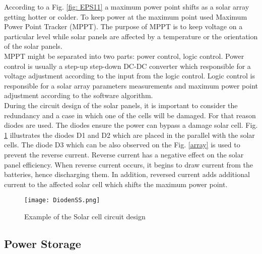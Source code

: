 According to a Fig. \ref{fig: EPS11} a maximum power point shifts as a solar array getting hotter or colder. To keep power at the maximum point used Maximum Power Point Tracker (MPPT). The purpose of MPPT is to keep voltage on a particular level while solar panels are affected by a temperature or the orientation of the solar panels.\\
\cite{20} MPPT might be separated into two parts: power control, logic control. Power control is usually a step-up step-down DC-DC  converter which responsible for a voltage adjustment according to the input from the logic control. Logic control is responsible for a solar array parameters measurements and maximum power point adjustment according to the software algorithm.\\  

During the circuit design of the solar panels, it is important to consider the redundancy and a case in which one of the cells will be damaged. For that reason diodes are used. The diodes ensure the power can bypass a damage solar cell. Fig. \ref{dioden} illustrates the diodes D1 and D2 which are placed in the parallel with the solar cells. The diode D3 which can be also observed on the Fig. \ref{array} is used to prevent the reverse current. Reverse current has a negative effect on the solar panel efficiency. When reverse current occurs, it begins to draw current from the batteries, hence discharging them. In addition, reversed current adds additional current to the affected solar cell which shifts the maximum power point.\\


\begin{figure}[h]
	\centering
	\texttt{[image: DiodenSS.png]}
	\caption{ Example of the Solar cell circuit design}
	\label{dioden}
\end{figure}
 
\newpage


\subsection{Power Storage \label{sec:tech1}}



